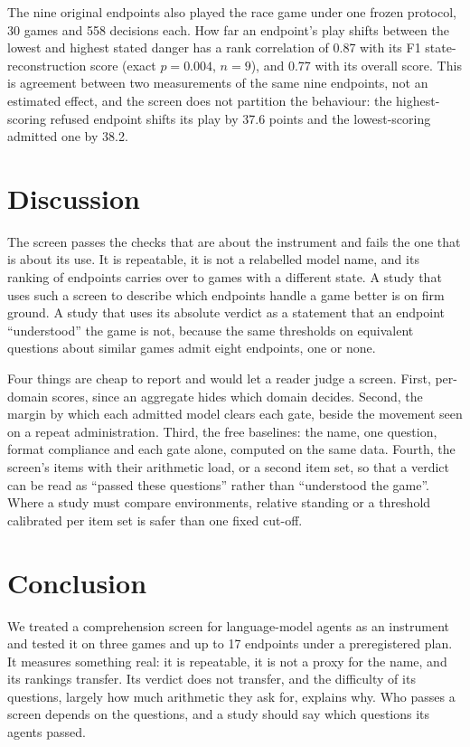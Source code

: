 \documentclass[11pt]{article}
\begin{document}
The nine original endpoints also played the race game under one frozen
protocol, 30 games and 558 decisions each. How far an endpoint's play shifts
between the lowest and highest stated danger has a rank correlation of 0.87
with its F1 state-reconstruction score (exact $p=0.004$, $n=9$), and 0.77 with
its overall score. This is agreement between two measurements of the same nine
endpoints, not an estimated effect, and the screen does not partition the
behaviour: the highest-scoring refused endpoint shifts its play by 37.6 points
and the lowest-scoring admitted one by 38.2.

\section{Discussion}
\label{sec:discussion}

The screen passes the checks that are about the instrument and fails the one
that is about its use. It is repeatable, it is not a relabelled model name,
and its ranking of endpoints carries over to games with a different state. A
study that uses such a screen to describe which endpoints handle a game better
is on firm ground. A study that uses its absolute verdict as a statement that an
endpoint ``understood'' the game is not, because the same thresholds on
equivalent questions about similar games admit eight endpoints, one or none.

Four things are cheap to report and would let a reader judge a screen. First,
per-domain scores, since an aggregate hides which domain decides. Second, the
margin by which each admitted model clears each gate, beside the movement seen
on a repeat administration. Third, the free baselines: the name, one question,
format compliance and each gate alone, computed on the same data. Fourth, the
screen's items with their arithmetic load, or a second item set, so that a
verdict can be read as ``passed these questions'' rather than ``understood the
game''. Where a study must compare environments, relative standing or a
threshold calibrated per item set is safer than one fixed cut-off.

\section{Conclusion}
\label{sec:conclusion}

We treated a comprehension screen for language-model agents as an instrument
and tested it on three games and up to 17 endpoints under a preregistered plan.
It measures something real: it is repeatable, it is not a proxy for the name,
and its rankings transfer. Its verdict does not transfer, and the difficulty of
its questions, largely how much arithmetic they ask for, explains why. Who
passes a screen depends on the questions, and a study should say which
questions its agents passed.
\end{document}
